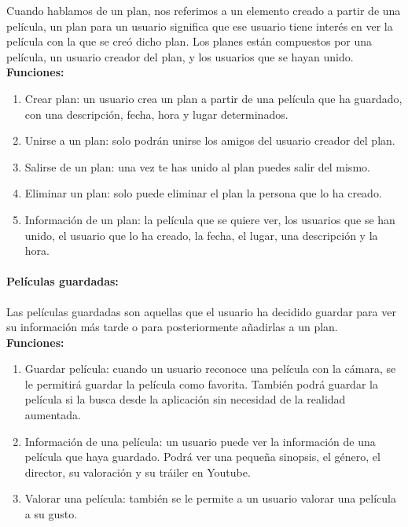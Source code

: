Cuando hablamos de un plan, nos referimos a un elemento creado a partir de una película, un plan para un usuario significa que ese usuario tiene interés en ver la película con la que se creó dicho plan.
Los planes están compuestos por una película, un usuario creador del plan, y los usuarios que se hayan unido.
\\
\textbf{Funciones:}
\begin{enumerate}
    \item Crear plan: un usuario crea un plan a partir de una película que ha guardado, con una descripción, fecha, hora y lugar determinados.
    \item Unirse a un plan: solo podrán unirse los amigos del usuario creador del plan.
    \item Salirse de un plan: una vez te has unido al plan puedes salir del mismo.
    \item Eliminar un plan: solo puede eliminar el plan la persona que lo ha creado.
    \item Información de un plan: la película que se quiere ver, los usuarios que se han unido, el usuario que lo ha creado, la fecha, el lugar, una descripción y la hora.
\end{enumerate} 
\paragraph{\large Películas guardadas:\\}

Las películas guardadas son aquellas que el usuario ha decidido guardar para ver su información más tarde o para posteriormente añadirlas a un plan.
\\
\textbf{Funciones:}
\begin{enumerate}
    \item Guardar película: cuando un usuario reconoce una película con la cámara, se le permitirá guardar la película como favorita. También podrá guardar la película si la busca desde la aplicación sin necesidad de la realidad aumentada.
    \item Información de una película: un usuario puede ver la información de una película que haya guardado. Podrá ver una pequeña sinopsis, el género, el director, su valoración y su tráiler en Youtube.
    \item Valorar una película: también se le permite a un usuario valorar una película a su gusto.
\end{enumerate} 
